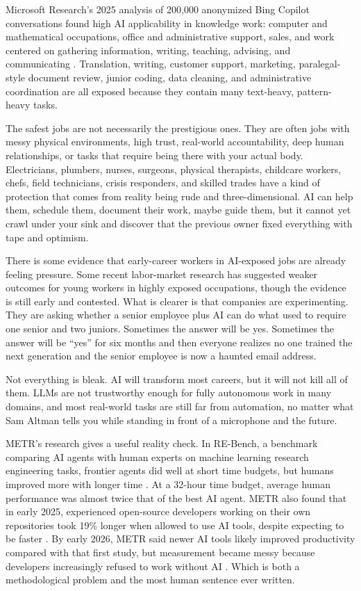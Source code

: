 \documentclass[12pt,oneside]{book}
\begin{document}
Microsoft Research's 2025 analysis of 200,000 anonymized Bing Copilot conversations found high AI applicability in knowledge work: computer and mathematical occupations, office and administrative support, sales, and work centered on gathering information, writing, teaching, advising, and communicating \parencite{microsoft2025workingai}. Translation, writing, customer support, marketing, paralegal-style document review, junior coding, data cleaning, and administrative coordination are all exposed because they contain many text-heavy, pattern-heavy tasks.

The safest jobs are not necessarily the prestigious ones. They are often jobs with messy physical environments, high trust, real-world accountability, deep human relationships, or tasks that require being there with your actual body. Electricians, plumbers, nurses, surgeons, physical therapists, childcare workers, chefs, field technicians, crisis responders, and skilled trades have a kind of protection that comes from reality being rude and three-dimensional. AI can help them, schedule them, document their work, maybe guide them, but it cannot yet crawl under your sink and discover that the previous owner fixed everything with tape and optimism.

There is some evidence that early-career workers in AI-exposed jobs are already feeling pressure. Some recent labor-market research has suggested weaker outcomes for young workers in highly exposed occupations, though the evidence is still early and contested. What is clearer is that companies are experimenting. They are asking whether a senior employee plus AI can do what used to require one senior and two juniors. Sometimes the answer will be yes. Sometimes the answer will be ``yes'' for six months and then everyone realizes no one trained the next generation and the senior employee is now a haunted email address.

Not everything is bleak. AI will transform most careers, but it will not kill all of them. LLMs are not trustworthy enough for fully autonomous work in many domains, and most real-world tasks are still far from automation, no matter what Sam Altman tells you while standing in front of a microphone and the future.

METR's research gives a useful reality check. In RE-Bench, a benchmark comparing AI agents with human experts on machine learning research engineering tasks, frontier agents did well at short time budgets, but humans improved more with longer time \parencite{metr2024rebench}. At a 32-hour time budget, average human performance was almost twice that of the best AI agent. METR also found that in early 2025, experienced open-source developers working on their own repositories took 19\% longer when allowed to use AI tools, despite expecting to be faster \parencite{metr2025developer}. By early 2026, METR said newer AI tools likely improved productivity compared with that first study, but measurement became messy because developers increasingly refused to work without AI \parencite{metr2026update}. Which is both a methodological problem and the most human sentence ever written.
\end{document}
